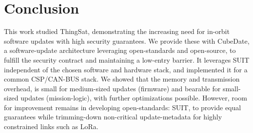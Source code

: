 \section{Conclusion}
\label{sec:conclusion}

This work studied ThingSat, demonstrating the increasing need for in-orbit software
updates with high security guarantees. We provide these with CubeDate, a
software-update architecture leveraging open-standards and open-source, to fulfill
the security contract and maintaining a low-entry barrier. It leverages SUIT independent
of the chosen software and hardware stack, and implemented it for a common CSP/CAN-BUS stack.
We showed that the memory and transmission overhead, is small for medium-sized
updates (firmware) and bearable for small-sized updates (mission-logic), with
further optimizations possible. However, room for improvement remains
in developing open-standards: SUIT, to provide equal guarantees while trimming-down
non-critical update-metadata for highly constrained links such as LoRa.
